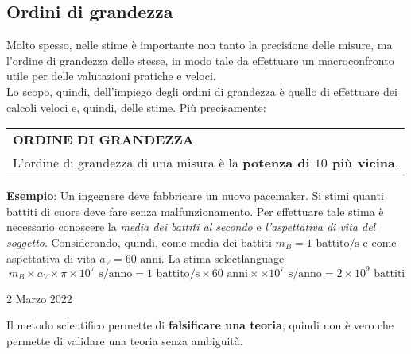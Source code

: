 \documentclass[a4paper]{extarticle}
\renewcommand\arraystretch{}
\begin{document}
\vspace{1em}
\subsection{Ordini di grandezza}
Molto spesso, nelle stime è importante non tanto la precisione delle misure, ma l'ordine di grandezza delle stesse, in modo tale da effettuare un macroconfronto utile per delle valutazioni pratiche e veloci.\\
Lo scopo, quindi, dell'impiego degli ordini di grandezza è quello di effettuare dei calcoli veloci e, quindi, delle stime. Più precisamente:

\vspace{1em}
\setlength{\tabcolsep}{14pt}
\renewcommand{\arraystretch}{2}
\noindent
\begin{tabularx}{\textwidth}{@{}|P|@{}}
    \hline
    {\textbf{ORDINE DI GRANDEZZA}}\\
    \parbox{\linewidth}{L'ordine di grandezza di una misura è la \textbf{potenza di $10$ più vicina}.
    \vspace{3mm}}\\
    \hline
\end{tabularx}

\vspace{1em}
\noindent
\textbf{Esempio}: Un ingegnere deve fabbricare un nuovo pacemaker. Si stimi quanti battiti di cuore deve fare senza malfunzionamento. Per effettuare tale stima è necessario conoscere la \textit{media dei battiti al secondo} e \textit{l'aspettativa di vita del soggetto}. Considerando, quindi, come media dei battiti $m_B = 1 \text{ battito}/\text{s}$ e come aspettativa di vita $a_V = 60 \text{ anni}$. La stima selectlanguage
\[m_B \times a_V \times \pi \times 10^7 \text{ s}/\text{anno} = 1 \text{ battito}/\text{s} \times 60 \text{ anni} \times \times 10^7 \text{ s}/\text{anno} = 2 \times 10^9 \text{ battiti}\]

\newpage
\noindent
\begin{center}
  2 Marzo 2022
\end{center}
Il metodo scientifico permette di \textbf{falsificare una teoria}, quindi non è vero che permette di validare una teoria senza ambiguità.

\vspace{1em}
\end{document}
